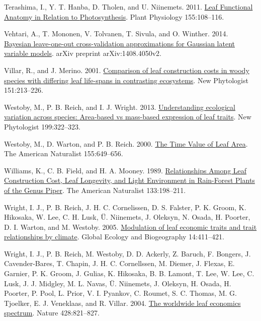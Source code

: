 \documentclass[
  12pt,
  a4paper,
,tablecaptionabove
]{scrartcl}
\newlength{\cslhangindent}
\newenvironment{CSLReferences}[2] %
 {%
  \setlength{\parindent}{0pt}
  \ifodd #1 \everypar{\setlength{\hangindent}{\cslhangindent}}\ignorespaces\fi
  \ifnum #2 > 0
  \setlength{\parskip}{#2\baselineskip}
  \fi
 }%
 {}
\begin{document}
\begin{CSLReferences}{1}{0}
\leavevmode{}%
Terashima, I., Y. T. Hanba, D. Tholen, and U. Niinemets. 2011. \href{https://doi.org/10.1104/pp.110.165472}{Leaf {Functional Anatomy} in {Relation} to {Photosynthesis}}. Plant Physiology 155:108--116.

\leavevmode{}%
Vehtari, A., T. Mononen, V. Tolvanen, T. Sivula, and O. Winther. 2014. \href{https://arxiv.org/abs/1408.4050v2}{Bayesian leave-one-out cross-validation approximations for {Gaussian} latent variable models}. arXiv preprint arXiv:1408.4050v2.

\leavevmode{}%
Villar, R., and J. Merino. 2001. \href{https://doi.org/10.1046/j.1469-8137.2001.00147.x}{Comparison of leaf construction costs in woody species with differing leaf life-spans in contrasting ecosystems}. New Phytologist 151:213--226.

\leavevmode{}%
Westoby, M., P. B. Reich, and I. J. Wright. 2013. \href{https://doi.org/10.1111/nph.12345}{Understanding ecological variation across species: {Area-based} vs mass-based expression of leaf traits}. New Phytologist 199:322--323.

\leavevmode{}%
Westoby, M., D. Warton, and P. B. Reich. 2000. \href{https://doi.org/10.1086/303346}{The {Time Value} of {Leaf Area}}. The American Naturalist 155:649--656.

\leavevmode{}%
Williams, K., C. B. Field, and H. A. Mooney. 1989. \href{https://doi.org/10.1086/284910}{Relationships {Among Leaf Construction Cost}, {Leaf Longevity}, and {Light Environment} in {Rain-Forest Plants} of the {Genus Piper}}. The American Naturalist 133:198--211.

\leavevmode{}%
Wright, I. J., P. B. Reich, J. H. C. Cornelissen, D. S. Falster, P. K. Groom, K. Hikosaka, W. Lee, C. H. Lusk, Ü. Niinemets, J. Oleksyn, N. Osada, H. Poorter, D. I. Warton, and M. Westoby. 2005. \href{https://doi.org/10.1111/j.1466-822x.2005.00172.x}{Modulation of leaf economic traits and trait relationships by climate}. Global Ecology and Biogeography 14:411--421.

\leavevmode{}%
Wright, I. J., P. B. Reich, M. Westoby, D. D. Ackerly, Z. Baruch, F. Bongers, J. Cavender-Bares, T. Chapin, J. H. C. Cornellssen, M. Diemer, J. Flexas, E. Garnier, P. K. Groom, J. Gulias, K. Hikosaka, B. B. Lamont, T. Lee, W. Lee, C. Lusk, J. J. Midgley, M. L. Navas, Ü. Niinemets, J. Oleksyn, H. Osada, H. Poorter, P. Pool, L. Prior, V. I. Pyankov, C. Roumet, S. C. Thomas, M. G. Tjoelker, E. J. Veneklaas, and R. Villar. 2004. \href{https://doi.org/10.1038/nature02403}{The worldwide leaf economics spectrum}. Nature 428:821--827.


\end{CSLReferences}
\end{document}

